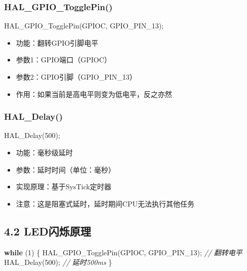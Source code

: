 \documentclass[
  chinese,
  UTF8,
  oneside,
  openany]{ctexbook}
\newenvironment{Shaded}{}{}
\newcommand{\CommentTok}[1]{\textcolor[rgb]{0.38,0.63,0.69}{\textit{#1}}}
\newcommand{\ControlFlowTok}[1]{\textcolor[rgb]{0.00,0.44,0.13}{\textbf{#1}}}
\newcommand{\DecValTok}[1]{\textcolor[rgb]{0.25,0.63,0.44}{#1}}
\newcommand{\NormalTok}[1]{#1}
\newcommand{\OperatorTok}[1]{\textcolor[rgb]{0.40,0.40,0.40}{#1}}
\providecommand{\tightlist}{%
  \setlength{\itemsep}{0pt}\setlength{\parskip}{0pt}}
\begin{document}
\subsubsection{HAL\_GPIO\_TogglePin()}\label{hal_gpio_togglepin}

\begin{Shaded}
\begin{Highlighting}[]
\NormalTok{HAL\_GPIO\_TogglePin}\OperatorTok{(}\NormalTok{GPIOC}\OperatorTok{,}\NormalTok{ GPIO\_PIN\_13}\OperatorTok{);}
\end{Highlighting}
\end{Shaded}

\begin{itemize}
\tightlist
\item
  功能：翻转GPIO引脚电平
\item
  参数1：GPIO端口（GPIOC）
\item
  参数2：GPIO引脚（GPIO\_PIN\_13）
\item
  作用：如果当前是高电平则变为低电平，反之亦然
\end{itemize}

\subsubsection{HAL\_Delay()}\label{hal_delay}

\begin{Shaded}
\begin{Highlighting}[]
\NormalTok{HAL\_Delay}\OperatorTok{(}\DecValTok{500}\OperatorTok{);}
\end{Highlighting}
\end{Shaded}

\begin{itemize}
\tightlist
\item
  功能：毫秒级延时
\item
  参数：延时时间（单位：毫秒）
\item
  实现原理：基于SysTick定时器
\item
  注意：这是阻塞式延时，延时期间CPU无法执行其他任务
\end{itemize}

\subsection{4.2 LED闪烁原理}\label{ledux95eaux70c1ux539fux7406}

\begin{Shaded}
\begin{Highlighting}[]
\ControlFlowTok{while} \OperatorTok{(}\DecValTok{1}\OperatorTok{)}
\OperatorTok{\{}
\NormalTok{  HAL\_GPIO\_TogglePin}\OperatorTok{(}\NormalTok{GPIOC}\OperatorTok{,}\NormalTok{ GPIO\_PIN\_13}\OperatorTok{);}  \CommentTok{// 翻转电平}
\NormalTok{  HAL\_Delay}\OperatorTok{(}\DecValTok{500}\OperatorTok{);}                           \CommentTok{// 延时500ms}
\OperatorTok{\}}
\end{Highlighting}
\end{Shaded}
\end{document}
